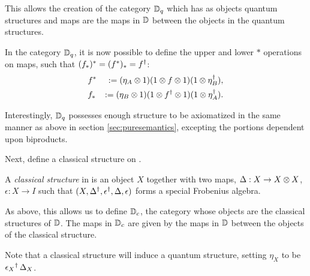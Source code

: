This allows the creation of the category $\mathbb{D}_{q}$ which has as objects quantum structures and maps
are the maps in $\mathbb{D}$ between the objects in the quantum structures.

In the category $\mathbb{D}_{q}$, it is now possible to define the upper and lower $*$ operations on maps,
such that $(f_{*})^{*}= (f^{*})_{*} = {f}^{\dagger}$:
\begin{eqnarray*}
&f^{*} &:= (\eta_{A}\otimes1) (1 \otimes f\otimes1) (1\otimes{\eta}^{\dagger}_{B}),\\
&f_{*} &:= (\eta_{B}\otimes1) (1 \otimes {f}^{\dagger}\otimes1) (1\otimes{\eta}^{\dagger}_{A}).
\end{eqnarray*}

Interestingly, $\mathbb{D}_{q}$ possesses enough structure to be axiomatized in the same manner as above in
section \ref{sec:puresemantics}, excepting the portions dependent upon biproducts.

Next, define a classical structure on \cD.
\begin{definition}\label{def:classicalstructure}
  A \emph{classical structure} in \cD{} is an object $X$ together with two maps, $\Delta :X \to X\otimes X$,
  $\epsilon:X\to I$ such that $(X,{\Delta}^{\dagger},{\epsilon}^{\dagger},\Delta,\epsilon)$ forms a special
  Frobenius algebra.
\end{definition}

As above, this allows us to define $\mathbb{D}_{c}$, the category whose objects are the classical
structures of $\mathbb{D}$. The maps in $\mathbb{D}_{c}$ are given by the maps in $\mathbb{D}$ between the
objects of the classical structure.

Note that a classical structure will induce a quantum structure, setting $\eta_{X}$ to be
${\epsilon_{X}}^{\dagger}\, \Delta_{X}$.


